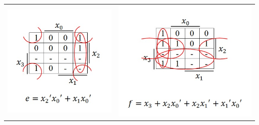 \documentclass{article}
\begin{document}
\begin{table}[h!]
\begin{tabular}{ c c }
\centering
\includegraphics[scale=0.6]{e-KMap} &
\includegraphics[scale=0.6]{f-KMap} \\
\end{tabular}
\end{table}
\end{document}
